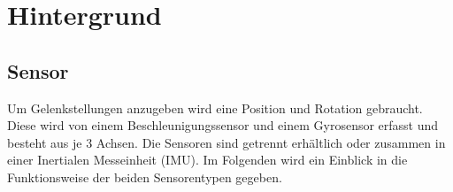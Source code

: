 \chapter{Hintergrund}
\label{ch:background}

\section{Sensor}
Um Gelenkstellungen anzugeben wird eine Position und Rotation gebraucht.
Diese wird von einem Beschleunigungssensor und einem Gyrosensor erfasst und besteht aus je 3 Achsen.
Die Sensoren sind getrennt erhältlich oder zusammen in einer Inertialen Messeinheit (IMU).
Im Folgenden wird ein Einblick in die Funktionsweise der beiden Sensorentypen gegeben.

